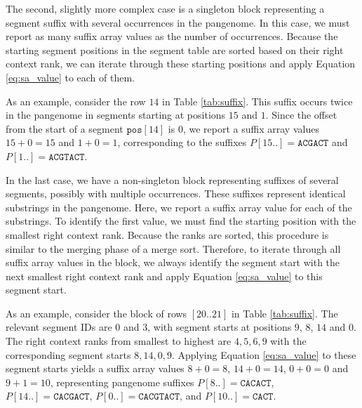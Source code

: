 The second, slightly more complex case is a singleton block representing a segment suffix with several occurrences in the pangenome.
In this case, we must report as many suffix array values as the number of occurrences.
Because the starting segment positions in the segment table are sorted based on their right context rank, we can iterate through these starting positions and apply Equation \ref{eq:sa_value} to each of them.

As an example, consider the row $14$ in Table \ref{tab:suffix}.
This suffix occurs twice in the pangenome in segments starting at positions $15$ and $1$.
Since the offset from the start of a segment $\texttt{pos}[14]$ is $0$, we report a suffix array values $15 + 0 = 15$ and $1 + 0 = 1$, corresponding to the suffixes $P[15..] = \texttt{ACGACT}$ and $P[1..] = \texttt{ACGTACT}$.

In the last case, we have a non-singleton block representing suffixes of several segments, possibly with multiple occurrences.
These suffixes represent identical substrings in the pangenome.
Here, we report a suffix array value for each of the substrings.
To identify the first value, we must find the starting position with the smallest right context rank.
Because the ranks are sorted, this procedure is similar to the merging phase of a merge sort.
Therefore, to iterate through all suffix array values in the block, we always identify the segment start with the next smallest right context rank and apply Equation \ref{eq:sa_value} to this segment start.

As an example, consider the block of rows $[20..21]$ in Table \ref{tab:suffix}.
The relevant segment IDs are $0$ and $3$, with segment starts at positions $9$, $8$, $14$ and $0$.
The right context ranks from smallest to highest are $4, 5, 6, 9$ with the corresponding segment starts $8, 14, 0, 9$.
Applying Equation \ref{eq:sa_value} to these segment starts yields a suffix array values $8 + 0 = 8$, $14 + 0 = 14$, $0 + 0 = 0$ and $9 + 1 = 10$, representing pangenome suffixes $P[8..] = \texttt{CACACT}$, $P[14..] = \texttt{CACGACT}$, $P[0..] = \texttt{CACGTACT}$, and $P[10..] = \texttt{CACT}$.

